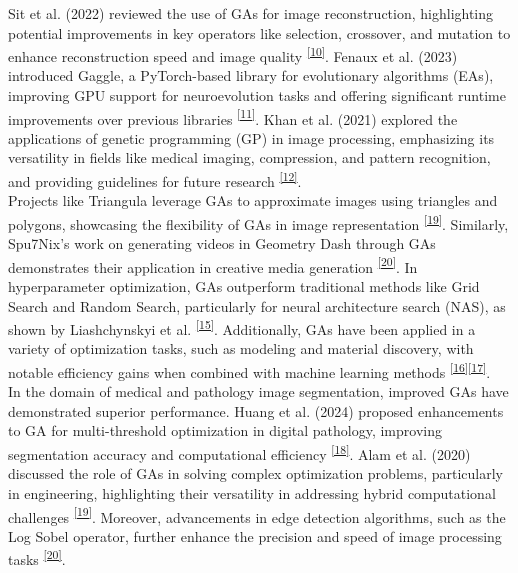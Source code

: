 \documentclass[10pt, conference]{IEEEtran}
\begin{document}
Sit et al. (2022) reviewed the use of GAs for image reconstruction, highlighting potential improvements in key operators like selection, crossover, and mutation to enhance reconstruction speed and image quality \hypertarget{ref}{\textsuperscript{\hyperref[sec:10r]{[10]}\label{sec:10}}}. Fenaux et al. (2023) introduced Gaggle, a PyTorch-based library for evolutionary algorithms (EAs), improving GPU support for neuroevolution tasks and offering significant runtime improvements over previous libraries \hypertarget{ref}{\textsuperscript{\hyperref[sec:11r]{[11]}\label{sec:11}}}. Khan et al. (2021) explored the applications of genetic programming (GP) in image processing, emphasizing its versatility in fields like medical imaging, compression, and pattern recognition, and providing guidelines for future research \hypertarget{ref}{\textsuperscript{\hyperref[sec:12r]{[12]}\label{sec:12}}}. \\

Projects like Triangula leverage GAs to approximate images using triangles and polygons, showcasing the flexibility of GAs in image representation \hypertarget{ref}{\textsuperscript{\hyperref[sec:19r]{[19]}\label{sec:19}}}. Similarly, Spu7Nix's work on generating videos in Geometry Dash through GAs demonstrates their application in creative media generation \hypertarget{ref}{\textsuperscript{\hyperref[sec:20r]{[20]}\label{sec:20}}}. In hyperparameter optimization, GAs outperform traditional methods like Grid Search and Random Search, particularly for neural architecture search (NAS), as shown by Liashchynskyi et al. \hypertarget{ref}{\textsuperscript{\hyperref[sec:15r]{[15]}\label{sec:15}}}. Additionally, GAs have been applied in a variety of optimization tasks, such as modeling and material discovery, with notable efficiency gains when combined with machine learning methods \hypertarget{ref}{\textsuperscript{\hyperref[sec:16r]{[16]}\label{sec:16}}}\hypertarget{ref}{\textsuperscript{\hyperref[sec:17r]{[17]}\label{sec:17}}}. \\

In the domain of medical and pathology image segmentation, improved GAs have demonstrated superior performance. Huang et al. (2024) proposed enhancements to GA for multi-threshold optimization in digital pathology, improving segmentation accuracy and computational efficiency \hypertarget{ref}{\textsuperscript{\hyperref[sec:18r]{[18]}\label{sec:18}}}. Alam et al. (2020) discussed the role of GAs in solving complex optimization problems, particularly in engineering, highlighting their versatility in addressing hybrid computational challenges \hypertarget{ref}{\textsuperscript{\hyperref[sec:19r]{[19]}\label{sec:19}}}. Moreover, advancements in edge detection algorithms, such as the Log Sobel operator, further enhance the precision and speed of image processing tasks \hypertarget{ref}{\textsuperscript{\hyperref[sec:20r]{[20]}\label{sec:20}}}. \\
\end{document}

